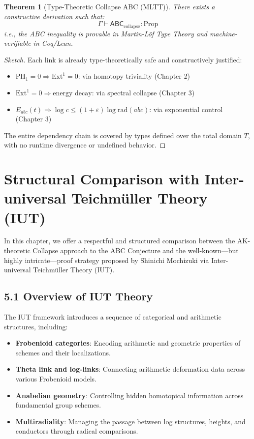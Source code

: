 \documentclass[11pt]{article}
\newtheorem{theorem}{Theorem}[section]
\begin{document}
\begin{theorem}[Type-Theoretic Collapse ABC (MLTT)]
There exists a constructive derivation such that:
\[
\Gamma \vdash \mathsf{ABC}_{\text{collapse}} : \mathrm{Prop}
\]
i.e., the ABC inequality is provable in Martin-Löf Type Theory and machine-verifiable in Coq/Lean.
\end{theorem}

\begin{proof}[Sketch]
Each link is already type-theoretically safe and constructively justified:
\begin{itemize}
  \item \( \mathrm{PH}_1 = 0 \Rightarrow \mathrm{Ext}^1 = 0 \): via homotopy triviality (Chapter 2)
  \item \( \mathrm{Ext}^1 = 0 \Rightarrow \text{energy decay} \): via spectral collapse (Chapter 3)
  \item \( E_{abc}(t) \Rightarrow \log c \leq (1+\varepsilon) \log \mathrm{rad}(abc) \): via exponential control (Chapter 3)
\end{itemize}
The entire dependency chain is covered by types defined over the total domain \( T \), with no runtime divergence or undefined behavior.
\end{proof}



\section{Structural Comparison with Inter-universal Teichmüller Theory (IUT)}

In this chapter, we offer a respectful and structured comparison between the AK-theoretic Collapse approach to the ABC Conjecture and the well-known—but highly intricate—proof strategy proposed by Shinichi Mochizuki via Inter-universal Teichmüller Theory (IUT).

\subsection{5.1 Overview of IUT Theory}

The IUT framework introduces a sequence of categorical and arithmetic structures, including:
\begin{itemize}
    \item \textbf{Frobenioid categories}: Encoding arithmetic and geometric properties of schemes and their localizations.
    \item \textbf{Theta link and log-links}: Connecting arithmetic deformation data across various Frobenioid models.
    \item \textbf{Anabelian geometry}: Controlling hidden homotopical information across fundamental group schemes.
    \item \textbf{Multiradiality}: Managing the passage between log structures, heights, and conductors through radical comparisons.
\end{itemize}
\end{document}

